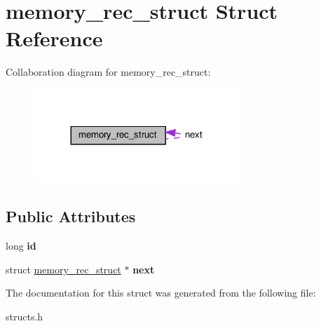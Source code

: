 \hypertarget{structmemory__rec__struct}{}\section{memory\+\_\+rec\+\_\+struct Struct Reference}
\label{structmemory__rec__struct}


Collaboration diagram for memory\+\_\+rec\+\_\+struct\+:
\nopagebreak
\begin{figure}[H]
\begin{center}
\leavevmode
\includegraphics[width=221pt]{structmemory__rec__struct__coll__graph}
\end{center}
\end{figure}
\subsection*{Public Attributes}
\begin{DoxyCompactItemize}
\item 
\mbox{\label{structmemory__rec__struct_abf0254762079384254d21eafa993ab4a}} 
long {\bfseries id}
\item 
\mbox{\label{structmemory__rec__struct_a55e8d387dc48a2dd11e4b1c86d7029c8}} 
struct \hyperlink{structmemory__rec__struct}{memory\+\_\+rec\+\_\+struct} $\ast$ {\bfseries next}
\end{DoxyCompactItemize}


The documentation for this struct was generated from the following file\+:\begin{DoxyCompactItemize}
\item 
structs.\+h\end{DoxyCompactItemize}
